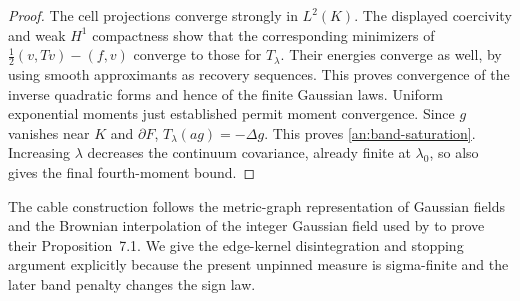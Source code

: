 \begin{proof}
The cell projections converge strongly in $L^2(K)$.  The displayed
coercivity and weak $H^1$ compactness show that the corresponding
minimizers of $\frac12(v,Tv)-(f,v)$ converge to those for
$T_\lambda$.  Their energies converge as well, by using smooth
approximants as recovery sequences.  This proves convergence of the
inverse quadratic forms and hence of the finite Gaussian laws.
Uniform exponential moments just established permit moment
convergence.  Since $g$ vanishes near $K$ and $\partial F$,
$T_\lambda(ag)=-\Delta g$.  This proves
\eqref{an:band-saturation}.  Increasing $\lambda$ decreases the
continuum covariance, already finite at $\lambda_0$, so also gives
the final fourth-moment bound.
\end{proof}

The cable construction follows the metric-graph representation of
Gaussian fields \citep{Lupu2016,LupuWerner2018} and the Brownian
interpolation of the integer Gaussian field used by
\citet[Section~7]{AizenmanHarelPeledShapiro2022} to prove their
Proposition~7.1.
We give the edge-kernel disintegration and stopping argument explicitly
because the present unpinned measure is sigma-finite and the later
band penalty changes the sign law.

